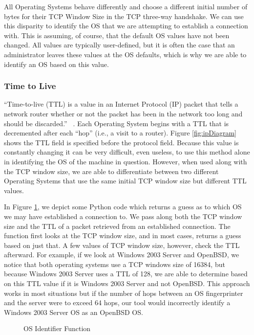 All Operating Systems behave differently and choose a different initial number of bytes for their TCP Window Size in the TCP three-way handshake.  We can use this disparity to identify the OS that we are attempting to establish a connection with.  This is assuming, of course, that the default OS values have not been changed.  All values are typically user-defined, but it is often the case that an administrator leaves these values at the OS defaults, which is why we are able to identify an OS based on this value.


\subsubsection{Time to Live}

``Time-to-live (TTL) is a value in an Internet Protocol (IP) packet that tells a network router whether or not the packet has been in the network too long and should be discarded.'' ~\cite{Rouse07}.  Each Operating System begins with a TTL that is decremented after each ``hop'' (i.e., a visit to a router). Figure \ref{fig:ipDiagram} shows the TTL field is specified before the protocol field.  Because this value is constantly changing it can be very difficult, even useless, to use this method alone in identifying the OS of the machine in question.  However, when used along with the TCP window size, we are able to differentiate between two different Operating Systems that use the same initial TCP window size but different TTL values.

In Figure \ref{fig:osFunction}, we depict some Python code which returns a guess as to which OS we may have established a connection to.  We pass along both the TCP window size and the TTL of a packet retrieved from an established connection. The function first looks at the TCP window size, and in most cases, returns a guess based on just that.  A few values of TCP window size, however, check the TTL afterward.  For example, if we look at Windows 2003 Server and OpenBSD, we notice that both operating systems use a TCP windows size of 16384, but because Windows 2003 Server uses a TTL of 128, we are able to determine based on this TTL value if it is Windows 2003 Server and not OpenBSD. This approach works in most situations but if the number of hops between an OS fingerprinter and the server were to exceed 64 hops, our tool would incorrectly identify a Windows 2003 Server OS as an OpenBSD OS.  

\begin{figure}
	\caption{\label{fig:osFunction} OS Identifier Function}
\end{figure}

